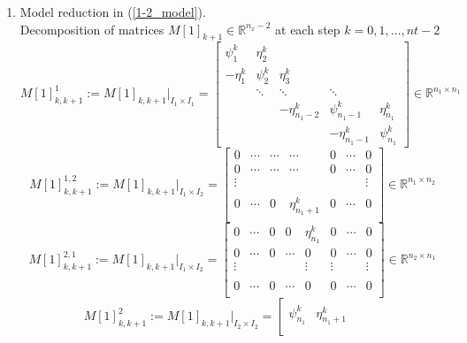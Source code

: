 \begin{enumerate}
\item Model reduction in (\ref{1-2_model}).
\\
Decomposition of matrices $M[1]_{k+1}\in \mathbb{R}^{n_{x}-2}$ at each step $k=0,1,\ldots,nt-2$ 
{\footnotesize
\begin{equation}
M[1]_{k,k+1}^{1}:=M[1]_{k,k+1}|_{I_{1}\times I_{1}}=\left[\begin{array}{lllllllllllll}
\psi_{1}^{k} & \eta_{2}^{k} & & & \\
-\eta_{1}^{k}& \psi_{2}^{k} &  \eta_{3}^{k} & &  \\
& \ddots & \ddots & \ddots   \\
& &-\eta_{n_{1}-2}^{k} & \psi_{n_{1}-1}^{k}  &\eta_{n_{1}}^{k}  \\
& &  &-\eta_{n_{1}-1 }^{k} &  \psi_{n_{1}}^{k} 
\end{array}\right]\in \mathbb{R}^{n_{1}\times n_{1}}
\end{equation}
\begin{equation}
M[1]_{k,k+1}^{1,2}:=M[1]_{k,k+1}|_{I_{1}\times I_{2}}=\left[\begin{array}{lllllllllllll}
0 &\cdots  &\cdots &\cdots &0 &\cdots &0 \\
0& \cdots &\cdots  &\cdots &0 &\cdots & 0 \\
\vdots & &  & & & &\vdots \\
& &  & & \\
0&\cdots &0& \eta_{n_{1}+1}^{k} &0    & \cdots  &0  \\
\end{array}\right]\in \mathbb{R}^{n_{1}\times n_{2}}
\end{equation}
\begin{equation}
M[1]_{k,k+1}^{2,1}:=M[1]_{k,k+1}|_{I_{1}\times I_{2}}=\left[\begin{array}{lllllllllllll}
0 & \cdots&0 &0 &\eta_{n_{1}}^{k} &0 &\cdots &0 \\
0& \cdots &  0 &\cdots &0 &0 &\cdots &0 \\
\vdots& & & & \vdots &\vdots & & \vdots \\
& &  & & \\
0& \cdots &  0 &\cdots &0&0 &\cdots &0 \\
\end{array}\right]\in \mathbb{R}^{n_{2}\times n_{1}}
\end{equation}
\begin{equation}
M[1]_{k,k+1}^{2}:=M[1]_{k,k+1}|_{I_{2}\times I_{2}}=\left[\begin{array}{lllllllllllll}
\psi_{n_{1}}^{k} & \eta_{n_{1}+1}^{k} & & & \\

\end{array}
\end{equation}}
\end{enumerate}
